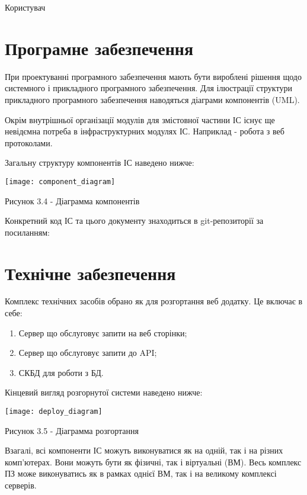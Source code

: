 Користувач 

\section{Програмне забезпечення}

При проектуванні програмного забезпечення мають бути вироблені рішення щодо системного і прикладного програмного забезпечення.
Для ілюстрації структури прикладного програмного забезпечення наводяться діаграми компонентів (UML).

Окрім внутрішньої організації модулів для змістовної частини ІС існує ще невідємна потреба в інфраструктурних модулях ІС. Наприклад -  робота з веб протоколами.

Загальну структуру компонентів ІС наведено нижче:

\begin{center}

\texttt{[image: component\_diagram]}

Рисунок 3.4 - Діаграмма компонентів
\end{center}

Конкретний код ІС та цього документу знаходиться в git-репозиторії за посиланням: \cite{repo}

\section{Технічне забезпечення}

Комплекс технічних засобів обрано як для розгортання веб додатку. Це включає в себе:

\begin{enumerate}

\item Сервер що обслуговує запити на веб сторінки;

\item Сервер що обслуговує запити до API;

\item СКБД для роботи з БД.

\end{enumerate}

Кінцевий вигляд розгорнутої системи наведено нижче:

\begin{center}

\texttt{[image: deploy\_diagram]}

Рисунок 3.5 - Діаграмма розгортання

\end{center}

Взагалі, всі компоненти ІС можуть виконуватися як на одній, так і на різних комп'ютерах.  Вони можуть бути як фізичні, так і віртуальні (ВМ). Весь комплекс ПЗ може виконуватись як в рамках однієї ВМ, так і на великому комплексі серверів.

